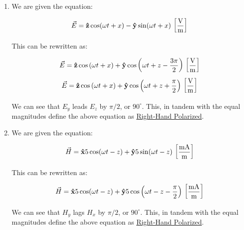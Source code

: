 \begin{enumerate}
\begin{enumerate}
      \item 

        We are given the equation:

        $$\vec{E}=\bold{\hat{z}}\cos(\omega t + x)-\bold{\hat{y}}\sin(\omega t + x)\,\left[ \frac{\si{\volt}}{\si{\meter}} \right]$$

        This can be rewritten as:

        $$\vec{E}=\bold{\hat{z}}\cos\left(\omega t + x\right)+\bold{\hat{y}}\cos\left(\omega t + z-\frac{3\pi}{2}\right)\,\left[ \frac{\si{\volt}}{\si{\meter}} \right]$$
        $$\vec{E}=\bold{\hat{z}}\cos\left(\omega t + x\right)+\bold{\hat{y}}\cos\left(\omega t + z+\frac{\pi}{2}\right)\,\left[ \frac{\si{\volt}}{\si{\meter}} \right]$$

        We can see that $E_y$ leads $E_z$ by $\pi/2$, or $90^{\circ}$. This, in tandem with the equal magnitudes define the above equation as \underline{Right-Hand Polarized}.

      \item 

        We are given the equation:

        $$\vec{H}=\bold{\hat{x}}5\cos(\omega t - z)+\bold{\hat{y}}5\sin(\omega t -z)\,\left[ \frac{\si{\milli\ampere}}{\si{\meter}} \right]$$

        This can be rewritten as:

        $$\vec{H}=\bold{\hat{x}}5\cos(\omega t - z)+\bold{\hat{y}}5\cos\left(\omega t -z-\frac{\pi}{2}\right)\,\left[ \frac{\si{\milli\ampere}}{\si{\meter}} \right]$$

        We can see that $H_y$ lags $H_x$ by $\pi/2$, or $90^{\circ}$. This, in tandem with the equal magnitudes define the above equation as \underline{Right-Hand Polarized}.

    \end{enumerate}

\end{enumerate}



